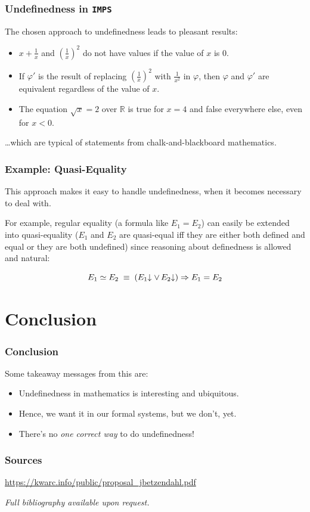 \documentclass[aspectratio=169, usenames, dvipsnames]{beamer}
\newcommand{\IMPS}{\texttt{IMPS}\xspace}
\newcommand{\defined}[1]{{#1}\mkern-5mu\downarrow}
\begin{document}
\begin{frame}
\frametitle{Undefinedness in \IMPS}

The chosen approach to undefinedness leads to pleasant results:
\medskip

\begin{itemize}
\item $x + \frac{1}{x}$ and $\left( \frac{1}{x}\right)^2$ do not have values if the value of $x$ is $0$.\medskip

\item If $\varphi\prime$ is the result of replacing $\left(\frac{1}{x}\right)^2$ with $\frac{1}{x^2}$ in $\varphi$, then $\varphi$ and $\varphi\prime$ are equivalent regardless of the value of $x$.\medskip

\item The equation $\sqrt{x} = 2$ over $\mathbb{R}$ is true for $x = 4$ and false everywhere else, even for $x < 0$.\medskip
\end{itemize}
\medskip

\dots which are typical of statements from chalk-and-blackboard mathematics.
\end{frame}

\begin{frame}
\frametitle{Example: Quasi-Equality}

This approach makes it easy to handle undefinedness, when it becomes necessary to deal with.\medskip

For example, regular equality (a formula like $E_1 = E_2$) can easily be extended into quasi-equality ($E_1$ and $E_2$ are quasi-equal iff they are either both defined and equal or they are both undefined) since reasoning about definedness is allowed and natural:

$$E_1 \simeq E_2 \;\equiv\; (\defined{E_1} \vee\, \defined{E_2}) \Rightarrow E_1 = E_2$$
\end{frame}

\section{Conclusion}

\begin{frame}
\frametitle{Conclusion}
Some takeaway messages from this are:
\bigskip

\begin{itemize}
\item Undefinedness in mathematics is interesting and ubiquitous.
\item Hence, we want it in our formal systems, but we don't, yet.
\item There's no \emph{one correct way} to do undefinedness!
\end{itemize}
\end{frame}

\begin{frame}
\frametitle{Sources}
\vfill
\begin{center}
\url{https://kwarc.info/public/proposal_jbetzendahl.pdf}
\medskip

\emph{Full bibliography available upon request.}
\end{center}
\vfill
\end{frame}
\end{document}
